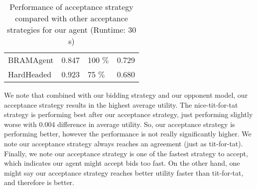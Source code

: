 \begin{table}[H]
\begin{tabular}{m{4.0cm}m{3.0cm}m{3.0cm}m{3.0cm}}
  BRAMAgent                     & 0.847                                                                 & 100 $\%$                                                             & 0.729                                                       \\ 
  HardHeaded                    & 0.923                                                                 & 75 $\%$                                                              & 0.680                                                      
  \\
  \bottomrule
\end{tabular}
\caption{Performance of acceptance strategy compared with other acceptance strategies for our agent (Runtime: $30$s) \label{table:as-results}}
\end{table}

We note that combined with our bidding strategy and our opponent model, our acceptance strategy results in the highest average utility.
The nice-tit-for-tat strategy is performing best after our acceptance strategy, just performing slightly worse with $0.004$ difference in average utility.
So, our acceptance strategy is performing better, however the performance is not really significantly higher.
We note our acceptance strategy always reaches an agreement (just as tit-for-tat).
Finally, we note our acceptance strategy is one of the fastest strategy to accept, which indicates our agent might accept bids too fast.
On the other hand, one might say our acceptance strategy reaches better utility faster than tit-for-tat, and therefore is better.

